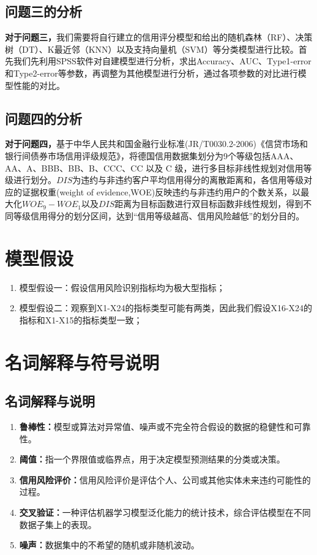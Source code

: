 \documentclass[12pt,a4paper]{nmmcm}
\newcommand\wordc[1]{\textbf{#1}}
\begin{document}
\subsection{问题三的分析}
\textbf{对于问题三，}我们需要将自行建立的信用评分模型和给出的随机森林（RF）、决策树（DT）、K最近邻（KNN）以及支持向量机（SVM）等分类模型进行比较。首先我们先利用SPSS软件对自建模型进行分析，求出Accuracy、AUC、Type1-error和Type2-error等参数，再调整为其他模型进行分析，通过各项参数的对比进行模型性能的对比。
\subsection{问题四的分析}
\textbf{对于问题四，}基于中华人民共和国金融行业标准(JR/T0030.2-2006)《信贷市场和银行间债券市场信用评级规范》，将德国信用数据集划分为9个等级包括AAA、AA、A、BBB、BB、B、CCC、CC 以及 C 级，进行多目标非线性规划对信用等级进行划分。$DIS$为违约与非违约客户平均信用得分的离散距离和，各信用等级对应的证据权重(weight of evidence,WOE)反映违约与非违约用户的个数关系，以最大化$WOE_{9}-WOE_{1}$以及$DIS$距离为目标函数进行双目标函数非线性规划，得到不同等级信用得分的划分区间，达到“信用等级越高、信用风险越低”的划分目的。
\section{模型假设}
\begin{enumerate}
  \item 模型假设一：假设信用风险识别指标均为极大型指标；
  \item 模型假设二：观察到X1-X24的指标类型可能有两类，因此我们假设X16-X24的指标和X1-X15的指标类型一致；
\end{enumerate}

\section{名词解释与符号说明}

\subsection{名词解释与说明}
\begin{enumerate}
\item \wordc{鲁棒性：}模型或算法对异常值、噪声或不完全符合假设的数据的稳健性和可靠性。

\item \wordc{阈值：}指一个界限值或临界点，用于决定模型预测结果的分类或决策。

\item \wordc{信用风险评价：}信用风险评价是评估个人、公司或其他实体未来违约可能性的过程。

\item \wordc{交叉验证：}一种评估机器学习模型泛化能力的统计技术，综合评估模型在不同数据子集上的表现。
\item \wordc{噪声：}数据集中的不希望的随机或非随机波动。
\end{enumerate}
\end{document}
